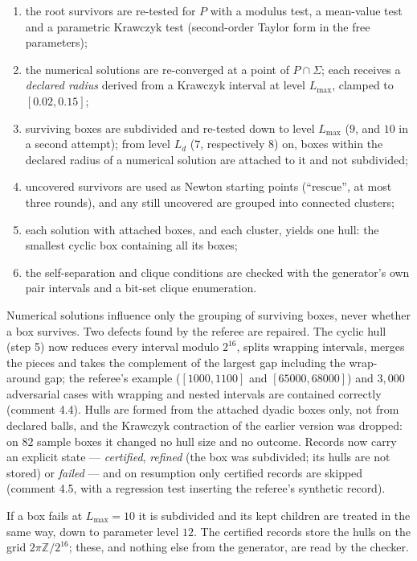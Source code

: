 \documentclass[
  11pt,
]{article}
\providecommand{\tightlist}{%
  \setlength{\itemsep}{0pt}\setlength{\parskip}{0pt}}
\begin{document}
\begin{enumerate}
\def\labelenumi{\arabic{enumi}.}
\tightlist
\item
  the root survivors are re-tested for \(P\) with a modulus test, a
  mean-value test and a parametric Krawczyk test (second-order Taylor
  form in the free parameters);
\item
  the numerical solutions are re-converged at a point of
  \(P\cap\Sigma\); each receives a \emph{declared radius} derived from a
  Krawczyk interval at level \(L_{\max}\), clamped to \([0.02,0.15]\);
\item
  surviving boxes are subdivided and re-tested down to level
  \(L_{\max}\) (\(9\), and \(10\) in a second attempt); from level
  \(L_d\) (\(7\), respectively \(8\)) on, boxes within the declared
  radius of a numerical solution are attached to it and not subdivided;
\item
  uncovered survivors are used as Newton starting points (``rescue'', at
  most three rounds), and any still uncovered are grouped into connected
  clusters;
\item
  each solution with attached boxes, and each cluster, yields one hull:
  the smallest cyclic box containing all its boxes;
\item
  the self-separation and clique conditions are checked with the
  generator's own pair intervals and a bit-set clique enumeration.
\end{enumerate}

Numerical solutions influence only the grouping of surviving boxes,
never whether a box survives. Two defects found by the referee are
repaired. The cyclic hull (step 5) now reduces every interval modulo
\(2^{16}\), splits wrapping intervals, merges the pieces and takes the
complement of the largest gap including the wrap-around gap; the
referee's example (\([1000,1100]\) and \([65000,68000]\)) and
\(3{,}000\) adversarial cases with wrapping and nested intervals are
contained correctly (comment 4.4). Hulls are formed from the attached
dyadic boxes only, not from declared balls, and the Krawczyk contraction
of the earlier version was dropped: on \(82\) sample boxes it changed no
hull size and no outcome. Records now carry an explicit state ---
\emph{certified}, \emph{refined} (the box was subdivided; its hulls are
not stored) or \emph{failed} --- and on resumption only certified
records are skipped (comment 4.5, with a regression test inserting the
referee's synthetic record).

If a box fails at \(L_{\max}=10\) it is subdivided and its kept children
are treated in the same way, down to parameter level \(12\). The
certified records store the hulls on the grid \(2\pi\mathbb Z/2^{16}\);
these, and nothing else from the generator, are read by the checker.
\end{document}

